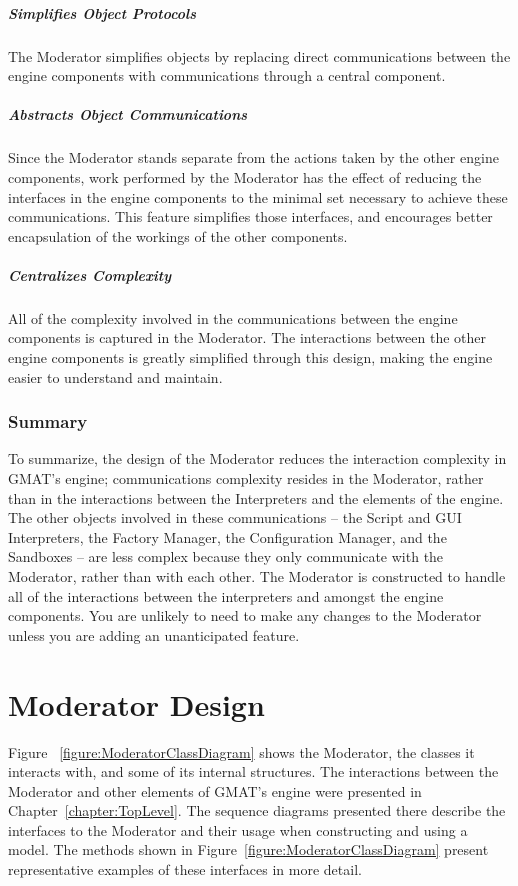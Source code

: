 \subparagraph{\textit{Simplifies Object Protocols}}  The Moderator simplifies objects by replacing
direct communications between the engine components with communications through a central component.

\subparagraph{\textit{Abstracts Object Communications}}  Since the Moderator stands separate from
the actions taken by the other engine components, work performed by the Moderator has the effect of
reducing the interfaces in the engine components to the minimal set necessary to achieve these
communications.  This feature simplifies those interfaces, and encourages better encapsulation of
the workings of the other components.

\subparagraph{\textit{Centralizes Complexity}}  All of the complexity involved in the communications
between the engine components is captured in the Moderator.  The interactions between the other
engine components is greatly simplified through this design, making the engine easier to understand
and maintain.

\subsubsection{Summary}

To summarize, the design of the Moderator reduces the interaction complexity in GMAT's engine;
communications complexity resides in the Moderator, rather than in the interactions between the
Interpreters and the elements of the engine.  The other objects involved in these communications --
the Script and GUI Interpreters, the Factory Manager, the Configuration Manager, and the Sandboxes
-- are less complex because they only communicate with the Moderator, rather than with each other.
The Moderator is constructed to handle all of the interactions between the interpreters and amongst
the engine components.  You are unlikely to need to make any changes to the Moderator unless you
are adding an unanticipated feature.

\section{Moderator Design}

Figure ~\ref{figure:ModeratorClassDiagram} shows the Moderator, the classes it interacts with, and
some of its internal structures.  The interactions between the Moderator and other elements of
GMAT's engine were presented in Chapter~\ref{chapter:TopLevel}.  The sequence diagrams presented
there describe the interfaces to the Moderator and their usage when constructing and using a model. 
The methods shown in Figure~\ref{figure:ModeratorClassDiagram} present representative examples of
these interfaces in more detail.

